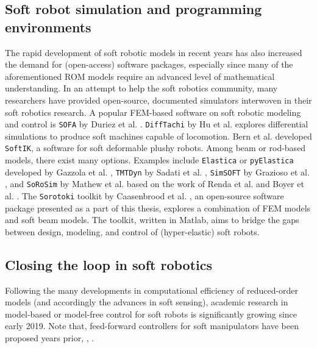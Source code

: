 \subsection{Soft robot simulation and programming environments}
The rapid development of soft robotic models in recent years has also increased the demand for (open-access) software packages, especially since many of the aforementioned ROM models require an advanced level of mathematical understanding. In an attempt to help the soft robotics community, many researchers have provided open-source, documented simulators interwoven in their soft robotics research. A popular FEM-based software on soft robotic modeling and control is \texttt{SOFA} by Duriez et al. \cite{Duriez2013,Coevoet2017}. \texttt{DiffTachi} by Hu et al. \cite{Hu2019taichi, Hu2019Oct} explores differential simulations to produce soft machines capable of locomotion. Bern et al. \cite{Bern2022,Bern2019} developed \texttt{SoftIK}, a software for soft deformable plushy robots. Among beam or rod-based models, there exist many options. Examples include \texttt{Elastica} or \texttt{pyElastica} \cite{Tekinalp2022} developed by Gazzola et al. \cite{Gazzola2018,Zhang2019}, \texttt{TMTDyn} by Sadati et al. \cite{Sadati2020}, \texttt{SimSOFT} by Grazioso et al. \cite{Grazioso2019}, and \texttt{SoRoSim} by Mathew et al. \cite{Mathew2022} based on the work of Renda et al. \cite{Renda2020} and Boyer et al. \cite{Boyer2021}. The \texttt{Sorotoki} toolkit by Caasenbrood et al. \cite{SorotokiCode}, an open-source software package presented as a part of this thesis, explores a combination of FEM models and soft beam models. The toolkit, written in Matlab, aims to bridge the gaps between design, modeling, and control of (hyper-elastic) soft robots.
\subsection{Closing the loop in soft robotics}
Following the many developments in computational efficiency of reduced-order models (and accordingly the advances in soft sensing), academic research in model-based or model-free control for soft robots is significantly growing since early 2019. Note that, feed-forward controllers for soft manipulators have been proposed years prior, \eg, \cite{Falkenhahn2015May,Falkenhahn2015,Thuruthel2017Oct,Satheeshbabu2019May}.


